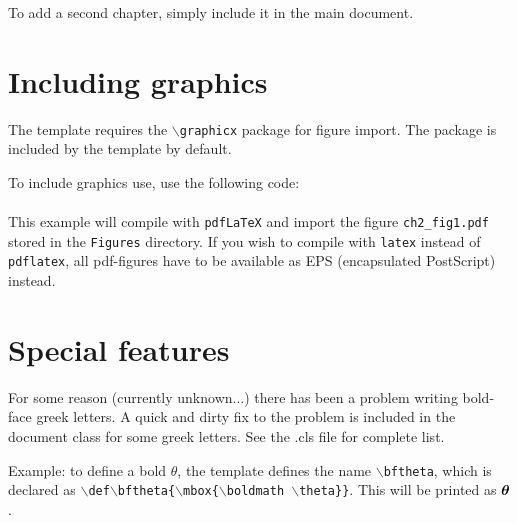 To add a second chapter, simply include it in the main document.

\section{Including graphics}
The template requires the \texttt{$\backslash$graphicx} package
for figure import. The package is included by the template by
default.

To include graphics use, use the following code:\\[\baselineskip]
\\[\baselineskip]

This example will compile with \texttt{pdfLaTeX} and import the
figure \texttt{ch2\_fig1.pdf} stored in the \texttt{Figures}
directory. If you wish to compile with \texttt{latex} instead of
\texttt{pdflatex}, all pdf-figures have to be available as EPS
(encapsulated PostScript) instead.

\section{Special features}
For some reason (currently unknown...) there has been a problem
writing bold-face greek letters. A quick and dirty fix to the
problem is included in the document class for some greek letters.
See the .cls file for complete list.

Example: to define a bold $\theta$, the template defines the name
\texttt{$\backslash$bftheta}, which is declared as
\texttt{$\backslash$def$\backslash$bftheta\{$\backslash$mbox\{$\backslash$boldmath
$\backslash$theta\}\}}. This will be printed as $\mbox{\boldmath $\theta$}$.
